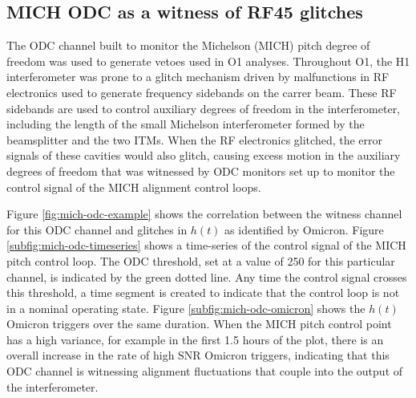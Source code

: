 \subsection{MICH ODC as a witness of RF45 glitches}

The ODC channel built to monitor the Michelson (MICH) pitch degree of freedom 
was used to generate vetoes used in O1 analyses. Throughout O1, the H1 
interferometer was prone to a glitch mechanism driven by malfunctions in 
RF electronics used to generate frequency sidebands on the carrer beam. 
These RF sidebands are used to control auxiliary degrees of freedom in the 
interferometer, including the length of the small Michelson interferometer 
formed by the beamsplitter and the two ITMs. When the RF electronics glitched, 
the error signals of these cavities would also glitch, causing excess motion 
in the auxiliary degrees of freedom that was witnessed by ODC monitors set 
up to monitor the control signal of the MICH alignment control loops. 

Figure \ref{fig:mich-odc-example} 
shows the correlation between the witness channel for this ODC channel 
and glitches in $h(t)$ as identified by Omicron. Figure \ref{subfig:mich-odc-timeseries} 
shows a time-series of the control signal of the MICH pitch control loop. The ODC threshold, 
set at a value of 250 for this particular channel, is indicated by the green dotted 
line. Any time the control signal crosses this threshold, a time segment is created to 
indicate that the control loop is not in a nominal operating state. Figure 
\ref{subfig:mich-odc-omicron} shows the $h(t)$ Omicron triggers over the same 
duration. When the MICH pitch control point has a high variance, for example 
in the first 1.5 hours of the plot, there is an 
overall increase in the rate of high SNR Omicron triggers, indicating that 
this ODC channel is witnessing alignment fluctuations that couple into the 
output of the interferometer. 

